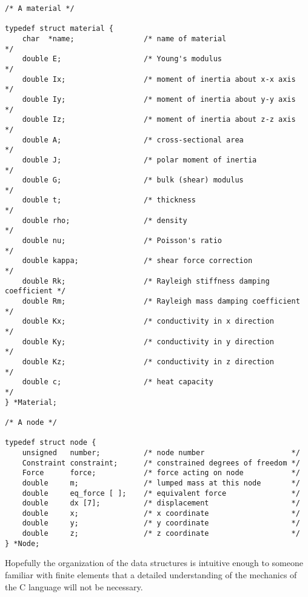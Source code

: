 {\begin{screen}
\begin{verbatim}
/* A material */

typedef struct material {
    char  *name;                /* name of material                       */
    double E;                   /* Young's modulus                        */
    double Ix;                  /* moment of inertia about x-x axis       */
    double Iy;                  /* moment of inertia about y-y axis       */
    double Iz;                  /* moment of inertia about z-z axis       */
    double A;                   /* cross-sectional area                   */
    double J;                   /* polar moment of inertia                */
    double G;                   /* bulk (shear) modulus                   */
    double t;                   /* thickness                              */
    double rho;                 /* density                                */
    double nu;                  /* Poisson's ratio                        */
    double kappa;               /* shear force correction                 */
    double Rk;                  /* Rayleigh stiffness damping coefficient */
    double Rm;                  /* Rayleigh mass damping coefficient      */ 
    double Kx;                  /* conductivity in x direction            */
    double Ky;                  /* conductivity in y direction            */
    double Kz;                  /* conductivity in z direction            */
    double c;                   /* heat capacity                          */
} *Material;

/* A node */

typedef struct node {
    unsigned   number;          /* node number                    */
    Constraint constraint;      /* constrained degrees of freedom */
    Force      force;           /* force acting on node           */
    double     m;               /* lumped mass at this node       */
    double     eq_force [ ];    /* equivalent force               */
    double     dx [7];          /* displacement                   */
    double     x;               /* x coordinate                   */
    double     y;               /* y coordinate                   */
    double     z;               /* z coordinate                   */
} *Node;
 \end{verbatim}
\end{screen}}

Hopefully the organization of the data structures is intuitive enough to 
someone familiar with finite elements that a detailed understanding of the 
mechanics of the C language will not be necessary.  		

